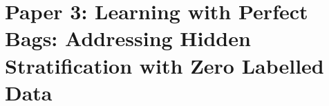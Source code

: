 \chapter{Paper 3: Learning with Perfect Bags: Addressing Hidden Stratification with Zero Labelled Data}\label{ch:paper3}


%







%


